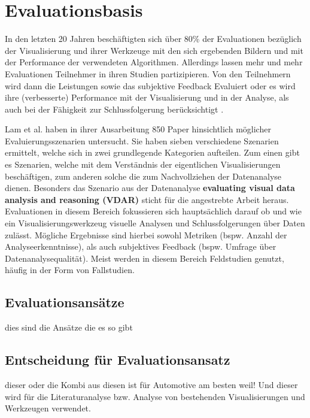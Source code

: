 \documentclass[draft=false
              ,paper=a4
              ,twoside=false
              ,fontsize=11pt
              ,headsepline
              ,BCOR10mm
              ,DIV11
              ]{scrbook}
\begin{document}
\chapter{Evaluationsbasis} %
\label{cha:evaluationsbasis}
In den letzten 20 Jahren beschäftigten sich über 80\% der Evaluationen bezüglich der Visualisierung und ihrer Werkzeuge mit den sich ergebenden Bildern und mit der Performance der verwendeten Algorithmen. Allerdings lassen mehr und mehr Evaluationen Teilnehmer in ihren Studien partizipieren. Von den Teilnehmern wird dann die Leistungen sowie das subjektive Feedback Evaluiert oder es wird ihre (verbesserte) Performance mit der Visualisierung und in der Analyse, als auch bei der Fähigkeit zur Schlussfolgerung berücksichtigt \cite{isenberg_systematic_2013}. 

Lam et al. haben in ihrer Ausarbeitung \cite{lam_empirical_2012} 850 Paper hinsichtlich möglicher Evaluierungsszenarien untersucht. Sie haben sieben verschiedene Szenarien ermittelt, welche sich in zwei grundlegende Kategorien aufteilen. Zum einen gibt es Szenarien, welche mit dem Verständnis der eigentlichen Visualisierungen beschäftigen, zum anderen solche die zum Nachvollziehen der Datenanalyse dienen. Besonders das Szenario aus der Datenanalyse \textbf{evaluating visual data analysis and reasoning (VDAR)} sticht für die angestrebte Arbeit heraus. Evaluationen in diesem Bereich fokussieren sich hauptsächlich darauf ob und wie ein Visualisierungswerkzeug visuelle Analysen und Schlussfolgerungen über Daten zulässt. Mögliche Ergebnisse sind hierbei sowohl Metriken (bspw. Anzahl der Analyseerkenntnisse), als auch subjektives Feedback (bspw. Umfrage über Datenanalysequalität). Meist werden in diesem Bereich Feldstudien genutzt, häufig in der Form von Fallstudien.

\section{Evaluationsansätze} %
\label{sec:evaluationsansätze}
dies sind die Ansätze die es so gibt

\section{Entscheidung für Evaluationsansatz} %
\label{sec:entscheidung_für_evaluationsansatz}
dieser oder die Kombi aus diesen ist für Automotive am besten weil! Und dieser wird für die Literaturanalyse bzw. Analyse von bestehenden Visualisierungen und Werkzeugen verwendet.
\end{document}
